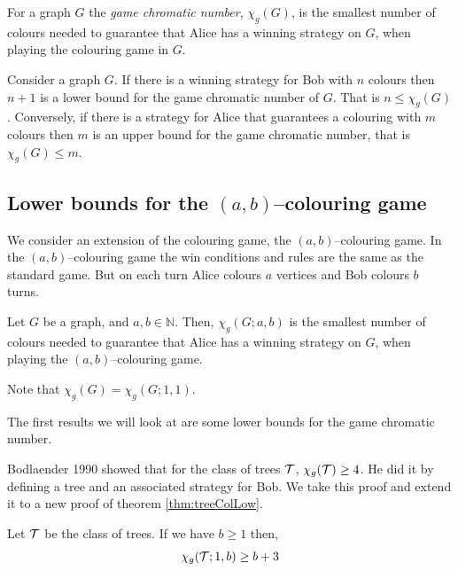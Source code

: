 
\begin{definition}
    For a graph $G$ the \textit{game chromatic number}, $\chi_g(G)$, is the smallest number of colours needed to guarantee that Alice has a winning strategy on $G$, when playing the colouring game in $G$.     
\end{definition}

Consider a graph $G$. If there is a winning strategy for Bob with $n$ colours then $n+1$ is a lower bound for the game chromatic number of $G$. That is $n\leq\chi_g(G)$. Conversely, if there is a strategy for Alice that guarantees a colouring with $m$ colours then $m$ is an upper bound for the game chromatic number, that is $\chi_g(G)\leq m$.

\subsection{Lower bounds for the $(a,b)$--colouring game}

We consider an extension of the colouring game, the $(a,b)$--colouring game. In the $(a,b)$--colouring game the win conditions and rules are the same as the standard game. But on each turn Alice colours $a$ vertices and Bob colours $b$ turns.
\begin{definition}
    Let $G$ be a graph, and $a,b\in\mathbb{N}$. 
    Then, $\chi_g(G;a,b)$ is the smallest number of colours needed to guarantee that Alice has a winning strategy on $G$, when playing the $(a,b)$--colouring game. 
\end{definition}
Note that $\chi_g(G) = \chi_g(G;1,1)$.

The first results we will look at are some lower bounds for the game chromatic number.


Bodlaender 1990 \cite{bodlander1990} showed that for the class of trees $\mathcal{T}$,  $\chi_g(\mathcal{T}) \geq 4$. He did it by defining a tree and an associated strategy for Bob. We take this proof and extend it to a new proof of theorem \ref{thm:treeColLow}. 

\begin{theorem}\label{thm:treeColLow} %
    Let $\mathcal{T}$ be the class of trees. If we have $b \geq 1$  then,
    \[\chi_g(\mathcal{T};1,b) \geq b+3 \]
\end{theorem}

